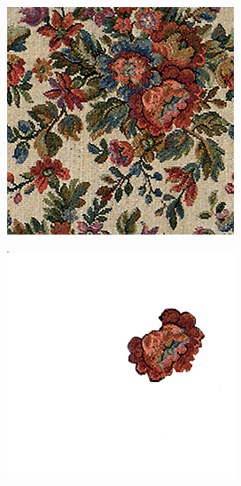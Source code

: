 \begin{figure}[]
\begin{subfigure}{\textwidth}
        \begin{subfigure}{0.24\textwidth}
            \centering
            \includegraphics[width=\textwidth]{images/04-experiment01/flowers/target.jpg}
            \caption*{}
        \end{subfigure}
        \hfill
        \begin{subfigure}{0.24\textwidth}
            \centering
            \includegraphics[width=\textwidth]{images/04-experiment01/flowers/one_bg.jpg}

\end{subfigure}
\end{subfigure}
\end{figure}
